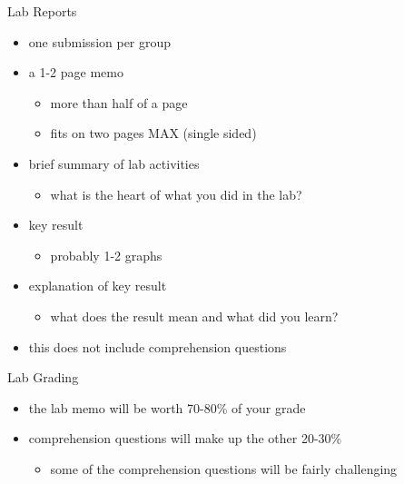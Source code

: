 \begin{frame}{Lab Reports}
\label{lab-reports}
\begin{itemize}
\tightlist
\item
  one submission per group
\item
  a 1-2 page memo

  \begin{itemize}
  \tightlist
  \item
    more than half of a page
  \item
    fits on two pages MAX (single sided)
  \end{itemize}
\item
  brief summary of lab activities

  \begin{itemize}
  \tightlist
  \item
    what is the heart of what you did in the lab?
  \end{itemize}
\item
  key result

  \begin{itemize}
  \tightlist
  \item
    probably 1-2 graphs
  \end{itemize}
\item
  explanation of key result

  \begin{itemize}
  \tightlist
  \item
    what does the result mean and what did you learn?
  \end{itemize}
\item
  this does not include comprehension questions
\end{itemize}
\end{frame}

\begin{frame}{Lab Grading}
\label{lab-grading}
\begin{itemize}
\tightlist
\item
  the lab memo will be worth 70-80\% of your grade
\item
  comprehension questions will make up the other 20-30\%

  \begin{itemize}
  \tightlist
  \item
    some of the comprehension questions will be fairly challenging
  \end{itemize}
\end{itemize}
\end{frame}

